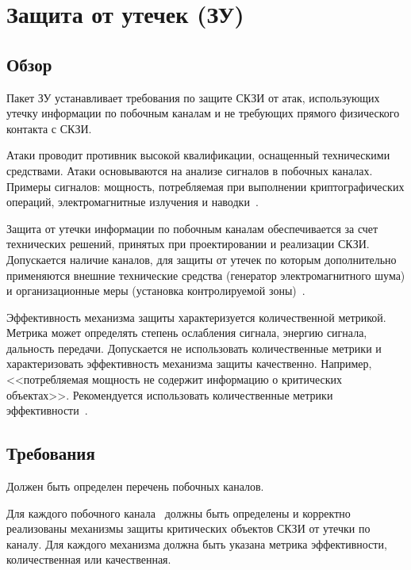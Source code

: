 \section{Защита от утечек (ЗУ)}\label{NI}

\subsection{Обзор}\label{NI.Intro}

Пакет ЗУ устанавливает требования по защите СКЗИ от атак, использующих утечку
информации по побочным каналам и не требующих прямого физического контакта с
СКЗИ.

Атаки проводит противник высокой квалификации, оснащенный 
техническими средствами. 
%
Атаки основываются на анализе сигналов в побочных каналах.
%
Примеры сигналов: мощность, потребляемая при выполнении криптографических
операций, электромагнитные излучения и наводки~.

Защита от утечки информации по побочным каналам обеспечивается за счет
технических решений, принятых при проектировании и реализации СКЗИ. Допускается
наличие каналов, для защиты от утечек по которым дополнительно применяются
внешние технические средства (генератор электромагнитного шума) и
организационные меры (установка контролируемой
зоны)~.

Эффективность механизма защиты характеризуется количественной метрикой.
Метрика может определять степень ослабления сигнала, энергию сигнала, 
дальность передачи.
%
Допускается не использовать количественные метрики и характеризовать
эффективность механизма защиты качественно. Например, <<потребляемая мощность не
содержит информацию о критических объектах>>.
%
Рекомендуется использовать количественные метрики
эффективности~.

\subsection{Требования}\label{NI.Reqs}


\label{R.NI.Channels} %
Должен быть определен перечень побочных каналов. 


\label{R.NI.Protect} %
Для каждого побочного канала~
должны быть определены и корректно реализованы механизмы защиты 
критических объектов СКЗИ от утечки по каналу. 
%
Для каждого механизма должна быть указана метрика эффективности,
количественная или качественная.

